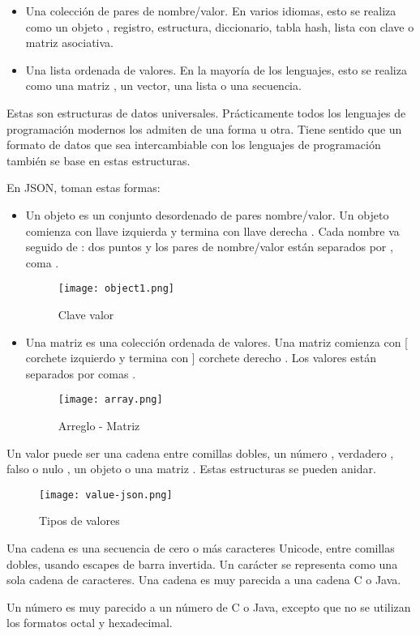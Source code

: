 \begin{enumerate}
\begin{itemize}
	\item Una colección de pares de nombre/valor. En varios idiomas, esto se realiza como un objeto , registro, estructura, diccionario, tabla hash, lista con clave o matriz asociativa.
	\item Una lista ordenada de valores. En la mayoría de los lenguajes, esto se realiza como una matriz , un vector, una lista o una secuencia.
\end{itemize}

Estas son estructuras de datos universales. Prácticamente todos los lenguajes de programación modernos los admiten de una forma u otra. Tiene sentido que un formato de datos que sea intercambiable con los lenguajes de programación también se base en estas estructuras.

En JSON, toman estas formas:

\begin{itemize}
	\item Un objeto es un conjunto desordenado de pares nombre/valor. Un objeto comienza con { llave izquierda y termina con } llave derecha . Cada nombre va seguido de : dos puntos y los pares de nombre/valor están separados por , coma .
	\begin{figure}[H]
		\center
		\texttt{[image: object1.png]}
		\caption{Clave valor}
	\end{figure}
	\item Una matriz es una colección ordenada de valores. Una matriz comienza con [ corchete izquierdo y termina con ] corchete derecho . Los valores están separados por comas .
	\begin{figure}[H]
		\center
		\texttt{[image: array.png]}
		\caption{Arreglo - Matriz}
	\end{figure}
\end{itemize}

Un valor puede ser una cadena entre comillas dobles, un número , verdadero , falso o nulo , un objeto o una matriz . Estas estructuras se pueden anidar.

	\begin{figure}[H]
	\center
	\texttt{[image: value-json.png]}
	\caption{Tipos de valores}
\end{figure}
\begin{remark}
Una cadena es una secuencia de cero o más caracteres Unicode, entre comillas dobles, usando escapes de barra invertida. Un carácter se representa como una sola cadena de caracteres. Una cadena es muy parecida a una cadena C o Java.
\end{remark}
\begin{remark}
Un número es muy parecido a un número de C o Java, excepto que no se utilizan los formatos octal y hexadecimal.
\end{remark}


\end{enumerate}
